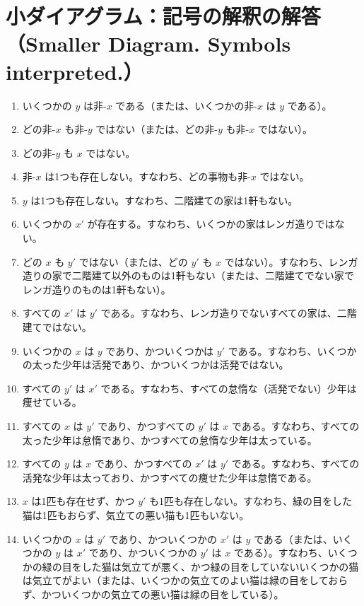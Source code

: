 \documentclass[a4paper,11pt,openany]{ltjsbook}
\begin{document}
\section{小ダイアグラム：記号の解釈の解答（Smaller Diagram. Symbols interpreted.）}

\begin{enumerate}[label=\textbf{\arabic*.}]
\item いくつかの $y$ は非-$x$ である（または、いくつかの非-$x$ は $y$ である）。
\item どの非-$x$ も非-$y$ ではない（または、どの非-$y$ も非-$x$ ではない）。
\item どの非-$y$ も $x$ ではない。
\item 非-$x$ は1つも存在しない。すなわち、どの事物も非-$x$ ではない。
\item $y$ は1つも存在しない。すなわち、二階建ての家は1軒もない。
\item いくつかの $x'$ が存在する。すなわち、いくつかの家はレンガ造りではない。
\item どの $x$ も $y'$ ではない（または、どの $y'$ も $x$ ではない）。すなわち、レンガ造りの家で二階建て以外のものは1軒もない（または、二階建てでない家でレンガ造りのものは1軒もない）。
\item すべての $x'$ は $y'$ である。すなわち、レンガ造りでないすべての家は、二階建てではない。
\item いくつかの $x$ は $y$ であり、かついくつかは $y'$ である。すなわち、いくつかの太った少年は活発であり、かついくつかは活発ではない。
\item すべての $y'$ は $x'$ である。すなわち、すべての怠惰な（活発でない）少年は痩せている。
\item すべての $x$ は $y'$ であり、かつすべての $y'$ は $x$ である。すなわち、すべての太った少年は怠惰であり、かつすべての怠惰な少年は太っている。
\item すべての $y$ は $x$ であり、かつすべての $x'$ は $y'$ である。すなわち、すべての活発な少年は太っており、かつすべての痩せた少年は怠惰である。
\item $x$ は1匹も存在せず、かつ $y'$ も1匹も存在しない。すなわち、緑の目をした猫は1匹もおらず、気立ての悪い猫も1匹もいない。
\item いくつかの $x$ は $y'$ であり、かついくつかの $x'$ は $y$ である（または、いくつかの $y$ は $x'$ であり、かついくつかの $y'$ は $x$ である）。すなわち、いくつかの緑の目をした猫は気立てが悪く、かつ緑の目をしていないいくつかの猫は気立てがよい（または、いくつかの気立てのよい猫は緑の目をしておらず、かついくつかの気立ての悪い猫は緑の目をしている）。

\end{enumerate}
\end{document}
